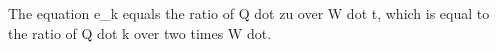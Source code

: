 The equation e_k equals the ratio of Q dot zu over W dot t, which is equal to the ratio of Q dot k over two times W dot.